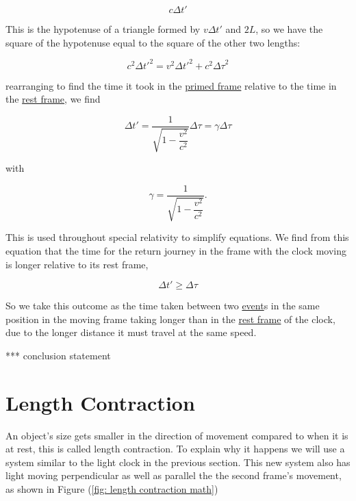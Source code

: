 \begin{equation}
	{c}{\Delta t{'}}
\end{equation}

This is the hypotenuse of a triangle formed by ${v}{\Delta t{'}}$ and $2{L}$, so we have the square of the hypotenuse equal to the square of the other two lengths:

\begin{equation}
	{c}^2 {\Delta t{'}}^2 = {v}^2 {\Delta t{'}}^2 + {c}^2{\Delta\tau}^2
\end{equation}

rearranging to find the time it took in the \hyperlink{def-Primed-Frame}{primed frame} relative to the time in the \hyperlink{def-proper-frame}{rest frame}, we find

\begin{equation}
	{\Delta t{'}} = \dfrac{1}{\sqrt{1-\dfrac{{v}^2}{{c}^2}}} {\Delta\tau} = {\gamma} {\Delta\tau}
\end{equation}

with

\begin{equation}
	{\gamma} = \dfrac{1}{\sqrt{1-\dfrac{{v}^2}{{c}^2}}}.
\end{equation}

This is used throughout special relativity to simplify equations.
We find from this equation that the time for the return journey in the frame with the clock moving is longer relative to its rest frame,

\begin{equation}
	{\Delta t{'}} \geq {\Delta\tau}
\end{equation}

So we take this outcome as the time taken between two \hyperlink{def-event}{event}s in the same position in the moving frame taking longer than in the \hyperlink{def-proper-frame}{rest frame} of the clock, due to the longer distance it must travel at the same speed.

*** conclusion statement

\section{Length Contraction} \label{sect: Length Contraction}

An object's size gets smaller in the direction of movement compared to when it is at rest, this is called length contraction.
To explain why it happens we will use a system similar to the light clock in the previous section.
This new system also has light moving perpendicular as well as parallel the the second frame's movement, as shown in Figure (\ref{fig: length contraction math})

